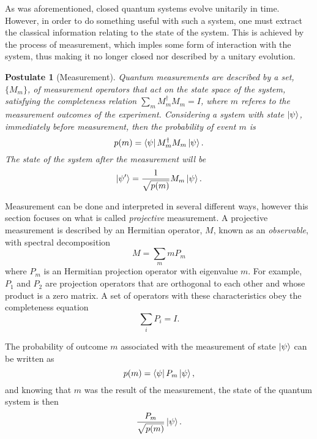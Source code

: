\documentclass[../../../dissertation.tex]{subfiles}
\newtheorem{post}{Postulate}
\begin{document}
As was aforementioned, closed quantum systems evolve unitarily in time.
However, in order to do something useful with such a system, one must extract
the classical information relating to the state of the system. This is achieved
by the process of measurement, which imples some form of interaction with the
system, thus making it no longer closed nor described by a unitary evolution.
\begin{post}[Measurement]
Quantum measurements are described by a set, $\{M_m\}$, of measurement operators
that act on the state space of the system, satisfying the completeness relation
$\sum_m M_m^\dag M_m = I$, where $m$ referes to the measurement outcomes of the
experiment. Considering a system with state $\ket{\psi}$, immediately before
measurement, then the probability of event $m$ is \begin{equation}
	p(m) = \bra{\psi} M_m^\dag M_m \ket{\psi}.
\end{equation}
The state of the system after the measurement will be
\begin{equation}
\ket{\psi'} = \frac{1}{\sqrt{p(m)}} M_m \ket{\psi}.
\end{equation}
\end{post}\par
Measurement can be done and interpreted in several different ways, however this
section focuses on what is called \textit{projective} measurement. A projective
measurement is described by an Hermitian operator, $M$, known as an
\textit{observable}, with spectral decomposition
\begin{equation}
	M = \sum_m m P_m
\end{equation}
where $P_m$ is an Hermitian projection operator with eigenvalue $m$. For
example, $P_1$ and $P_2$ are projection operators that are orthogonal to each
other and whose product is a zero matrix. A set of operators with these
characteristics obey the completeness equation 
\begin{equation}
	\sum_i P_i = I.
\end{equation}\par
The probability of outcome $m$ associated with the measurement of state
$\ket{\psi}$ can be written as 
\begin{equation}
	p(m) = \bra{\psi} P_m \ket{\psi},
\end{equation}
and knowing that $m$ was the result of the measurement, the state of the
quantum system is then
\begin{equation}
	\frac{P_m}{\sqrt{p(m)}} \ket{\psi}.
\end{equation}\par
\end{document}

